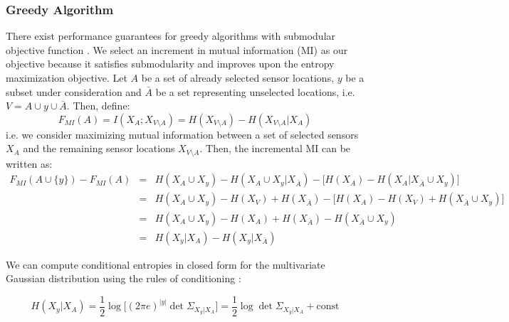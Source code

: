 
\subsubsection{Greedy Algorithm}

There exist performance guarantees for greedy algorithms with submodular objective function \cite{Kraus2008}. We select an increment in mutual information (MI) as our objective because it satisfies submodularity and improves upon the entropy maximization objective. Let $A$ be a set of already selected sensor locations, $y$ be a subset under consideration and $\bar{A}$ be a set representing unselected locations, i.e. $V = A \cup y \cup \bar{A}$. Then, define:
\begin{equation}
    F_{MI}(A) = I(X_{A}; X_{V\setminus A}) = H(X_{V\setminus A}) - H(X_{V\setminus A}|X_A)
\end{equation}
i.e. we consider maximizing mutual information between a set of selected sensors $X_A$ and the remaining sensor locations $X_{V\setminus A}$. Then, the incremental MI can be written as:
\begin{eqnarray}
   F_{MI}(A\cup \{y\}) - F_{MI}(A) &=& H(X_A\cup X_y) - H(X_A\cup X_y|X_{\bar{A}}) - \big[H(X_A) - H(X_A|X_{\bar{A}}\cup X_y) \big] \nonumber \\
    &=& H(X_A\cup X_y) - H(X_V) + H(X_{\bar{A}}) - \big[H(X_A) - H(X_V) + H(X_{\bar{A}}\cup X_{y}) \big] \nonumber \\
    &=& H(X_A\cup X_y) - H(X_A) + H(X_{\bar{A}}) - H(X_{\bar{A}}\cup X_y) \nonumber \\
    &=& H(X_y|X_A) - H(X_y|X_{\bar{A}})
\end{eqnarray}

We can compute conditional entropies in closed form for the multivariate Gaussian distribution using the rules of conditioning \cite{BishopPRML}:

\begin{equation}
H(X_y|X_A) = \frac{1}{2}\log\bigg[(2\pi e)^{|y|}\det \Sigma_{X_y|X_A} \bigg] = \frac{1}{2}\log \det \Sigma_{X_y|X_A} + \mathrm{const}
\end{equation}

